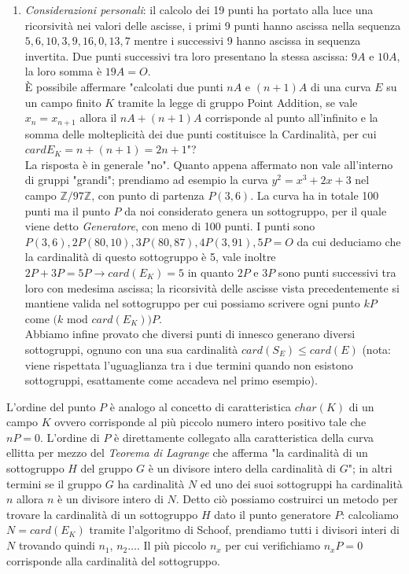 \documentclass[a4paper,12pt]{tesiinfo}
\begin{document}
\begin{enumerate}
    \item \textit{Considerazioni personali}: il calcolo dei 19 punti ha portato alla luce una ricorsivit\`a nei valori delle ascisse, i primi 9 punti hanno ascissa nella sequenza $5, 6, 10, 3, 9, 16, 0, 13, 7$ mentre i successivi 9 hanno ascissa in sequenza invertita. Due punti successivi tra loro presentano la stessa ascissa: $9A$ e $10A$, la loro somma \`e $19A = O$. 
    \\
    \`E possibile affermare "calcolati due punti $nA$ e $(n+1)A$ di una curva $E$ su un campo finito $K$ tramite la legge di gruppo Point Addition, se vale $x_n = x_{n+1}$ allora il $nA + (n+1)A$ corrisponde al punto all'infinito e la somma delle molteplicit\`a dei due punti costituisce la Cardinalit\`a, per cui $cardE_K = n+(n+1) = 2n+1$"?
    \\
    La risposta \`e in generale "no". Quanto appena affermato non vale all'interno di gruppi "grandi"; prendiamo ad esempio la curva $y^2 = x^3 + 2x+3$ nel campo $\mathbb{Z}/97\mathbb{Z}$, con punto di partenza $P(3, 6)$. La curva ha in totale 100 punti ma il punto $P$ da noi considerato genera un sottogruppo, per il quale viene detto \textit{Generatore}, con meno di 100 punti. I punti sono $P(3, 6), 2P(80, 10), 3P(80, 87), 4P(3, 91), 5P = O$ da cui deduciamo che la cardinalit\`a di questo sottogruppo \`e 5, vale inoltre $2P+3P = 5P \to card(E_K) = 5$ in quanto $2P$ e $3P$ sono punti successivi tra loro con medesima ascissa; la ricorsivit\`a delle ascisse vista precedentemente si mantiene valida nel sottogruppo per cui possiamo scrivere ogni punto $kP$ come $(k$ mod $card(E_K))P$.\\
    Abbiamo infine provato che diversi punti di innesco generano diversi sottogruppi, ognuno con una sua cardinalit\`a $card(S_E) \le card(E)$ (nota: viene rispettata l'uguaglianza tra i due termini quando non esistono sottogruppi, esattamente come accadeva nel primo esempio). 
    
\end{enumerate}
L'ordine del punto $P$ \`e analogo al concetto di caratteristica $char(K)$ di un campo $K$ ovvero corrisponde al pi\`u piccolo numero intero positivo tale che $nP = 0$. L'ordine di $P$ \`e direttamente collegato alla caratteristica della curva ellitta per mezzo del \textit{Teorema di Lagrange} che afferma "la cardinalit\`a di un sottogruppo $H$ del gruppo $G$ \`e un divisore intero della cardinalit\`a di $G$"; in altri termini se il gruppo $G$ ha cardinalit\`a $N$ ed uno dei suoi sottogruppi ha cardinalit\`a $n$ allora $n$ \`e un divisore intero di $N$. Detto ci\`o possiamo costruirci un metodo per trovare la cardinalit\`a di un sottogruppo $H$ dato il punto generatore $P$: calcoliamo $N = card(E_K)$ tramite l'algoritmo di Schoof, prendiamo tutti i divisori interi di $N$ trovando quindi $n_1$, $n_2 \ldots$. Il pi\`u piccolo $n_x$ per cui verifichiamo $n_xP = 0$ corrisponde alla cardinalit\`a del sottogruppo.
\end{document}
